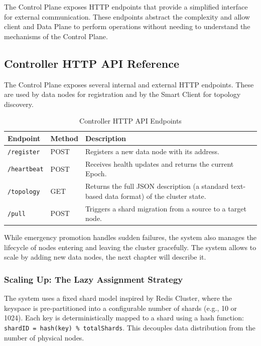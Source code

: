 \documentclass[shortabstract]{iithesis}
\begin{document}
The Control Plane exposes HTTP endpoints that provide a simplified interface for external communication. These endpoints abstract the complexity and allow client and Data Plane to perform operations without needing to understand the mechanisms of the Control Plane.

\subsection{Controller HTTP API Reference}
The Control Plane exposes several internal and external HTTP endpoints. These are used by data nodes for registration and by the Smart Client for topology discovery.

\begin{table}[h!]
\centering
\caption{Controller HTTP API Endpoints}
\label{tab:controller_endpoints}
\begin{tabularx}{\textwidth}{|l|l|X|}
\hline
\textbf{Endpoint} & \textbf{Method} & \textbf{Description} \\ \hline
\texttt{/register} & POST & Registers a new data node with its address. \\ \hline
\texttt{/heartbeat} & POST & Receives health updates and returns the current Epoch. \\ \hline
\texttt{/topology} & GET & Returns the full JSON description (a standard text-based data format) of the cluster state. \\ \hline
\texttt{/pull} & POST & Triggers a shard migration from a source to a target node. \\ \hline
\end{tabularx}
\end{table}
While emergency promotion handles sudden failures, the system also manages the lifecycle of nodes entering and leaving the cluster gracefully. The system allows to scale by adding new data nodes, the next chapter will describe it.

\subsubsection{Scaling Up: The Lazy Assignment Strategy}
The system uses a fixed shard model inspired by Redis Cluster, where the keyspace is pre-partitioned into a configurable number of shards (e.g., 10 or 1024). Each key is deterministically mapped to a shard using a hash function: \texttt{shardID = hash(key) \% totalShards}. This decouples data distribution from the number of physical nodes.
\end{document}
